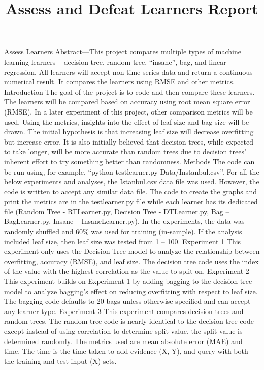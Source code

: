 \documentclass{article}
\begin{document}
\title{Assess and Defeat Learners Report}
\author{}
\date{}
\maketitle

Assess Learners
Abstract—This project compares multiple types of machine learning learners – decision tree, random tree, “insane”, bag, and linear regression. All learners will accept non-time series data and return a continuous numerical result. It compares the learners using RMSE and other metrics.
Introduction
The goal of the project is to code and then compare these learners. The learners will be compared based on accuracy using root mean square error (RMSE). In a later experiment of this project, other comparison metrics will be used. Using the metrics, insights into the effect of leaf size and bag size will be drawn. The initial hypothesis is that increasing leaf size will decrease overfitting but increase error. It is also initially believed that decision trees, while expected to take longer, will be more accurate than random trees due to decision trees’ inherent effort to try something better than randomness.
Methods
The code can be run using, for example, “python testlearner.py Data/Instanbul.csv”. For all the below experiments and analyses, the Istanbul.csv data file was used. However, the code is written to accept any similar data file. The code to create the graphs and print the metrics are in the testlearner.py file while each learner has its dedicated file (Random Tree - RTLearner.py, Decision Tree - DTLearner.py, Bag – BagLearner.py, Insane – InsaneLearner.py).
In the experiments, the data was randomly shuffled and 60\% was used for training (in-sample). If the analysis included leaf size, then leaf size was tested from 1 – 100.
Experiment 1 
This experiment only uses the Decision Tree model to analyze the relationship between overfitting, accuracy (RMSE), and leaf size. The decision tree code uses the index of the value with the highest correlation as the value to split on.
Experiment 2
This experiment builds on Experiment 1 by adding bagging to the decision tree model to analyze bagging’s effect on reducing overfitting with respect to leaf size. The bagging code defaults to 20 bags unless otherwise specified and can accept any learner type.
Experiment 3
This experiment compares decision trees and random trees. The random tree code is nearly identical to the decision tree code except instead of using correlation to determine split value, the split value is determined randomly. The metrics used are mean absolute error (MAE) and time. The time is the time taken to add evidence (X, Y), and query with both the training and test input (X) sets.
\end{document}
